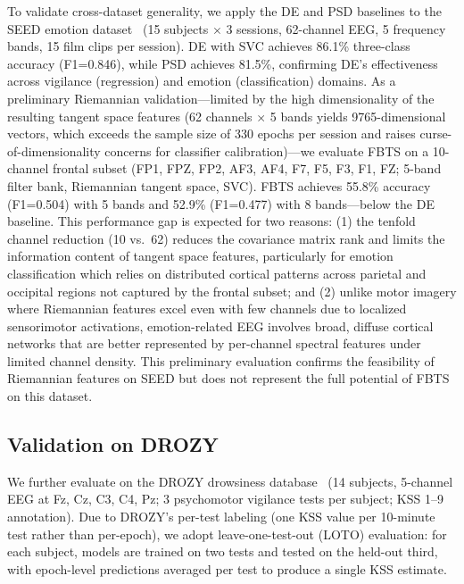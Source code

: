 \documentclass{iopjournal}
\begin{document}
To validate cross-dataset generality, we apply the DE and PSD baselines to the SEED emotion dataset~\cite{zheng2015investigating} (15 subjects $\times$ 3 sessions, 62-channel EEG, 5 frequency bands, 15 film clips per session). DE with SVC achieves 86.1\% three-class accuracy (F1=0.846), while PSD achieves 81.5\%, confirming DE's effectiveness across vigilance (regression) and emotion (classification) domains. As a preliminary Riemannian validation---limited by the high dimensionality of the resulting tangent space features (62 channels $\times$ 5 bands yields 9765-dimensional vectors, which exceeds the sample size of 330 epochs per session and raises curse-of-dimensionality concerns for classifier calibration)---we evaluate FBTS on a 10-channel frontal subset (FP1, FPZ, FP2, AF3, AF4, F7, F5, F3, F1, FZ; 5-band filter bank, Riemannian tangent space, SVC). FBTS achieves 55.8\% accuracy (F1=0.504) with 5 bands and 52.9\% (F1=0.477) with 8 bands---below the DE baseline. This performance gap is expected for two reasons: (1) the tenfold channel reduction (10 vs.\ 62) reduces the covariance matrix rank and limits the information content of tangent space features, particularly for emotion classification which relies on distributed cortical patterns across parietal and occipital regions not captured by the frontal subset; and (2) unlike motor imagery where Riemannian features excel even with few channels due to localized sensorimotor activations, emotion-related EEG involves broad, diffuse cortical networks that are better represented by per-channel spectral features under limited channel density. This preliminary evaluation confirms the feasibility of Riemannian features on SEED but does not represent the full potential of FBTS on this dataset.

\subsection{Validation on DROZY}

We further evaluate on the DROZY drowsiness database~\cite{massoz2016drozy} (14 subjects, 5-channel EEG at Fz, Cz, C3, C4, Pz; 3 psychomotor vigilance tests per subject; KSS 1--9 annotation). Due to DROZY's per-test labeling (one KSS value per 10-minute test rather than per-epoch), we adopt leave-one-test-out (LOTO) evaluation: for each subject, models are trained on two tests and tested on the held-out third, with epoch-level predictions averaged per test to produce a single KSS estimate.
\end{document}
